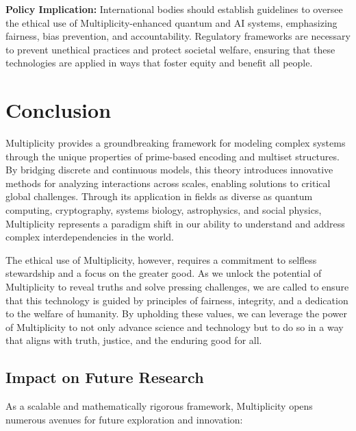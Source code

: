 \documentclass{article}
\theoremstyle{plain}
\begin{document}
\textbf{Policy Implication:} International bodies should establish guidelines to oversee the ethical use of Multiplicity-enhanced quantum and AI systems, emphasizing fairness, bias prevention, and accountability. Regulatory frameworks are necessary to prevent unethical practices and protect societal welfare, ensuring that these technologies are applied in ways that foster equity and benefit all people.

\section{Conclusion}

Multiplicity provides a groundbreaking framework for modeling complex systems through the unique properties of prime-based encoding and multiset structures. By bridging discrete and continuous models, this theory introduces innovative methods for analyzing interactions across scales, enabling solutions to critical global challenges. Through its application in fields as diverse as quantum computing, cryptography, systems biology, astrophysics, and social physics, Multiplicity represents a paradigm shift in our ability to understand and address complex interdependencies in the world.

The ethical use of Multiplicity, however, requires a commitment to selfless stewardship and a focus on the greater good. As we unlock the potential of Multiplicity to reveal truths and solve pressing challenges, we are called to ensure that this technology is guided by principles of fairness, integrity, and a dedication to the welfare of humanity. By upholding these values, we can leverage the power of Multiplicity to not only advance science and technology but to do so in a way that aligns with truth, justice, and the enduring good for all.

\subsection{Impact on Future Research}

As a scalable and mathematically rigorous framework, Multiplicity opens numerous avenues for future exploration and innovation:
\end{document}
